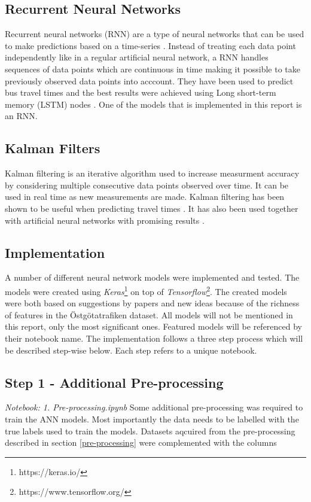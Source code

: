 \subsection{Recurrent Neural Networks}
Recurrent neural networks (RNN) are a type of neural networks that can be used to make predictions based on a time-series \cite{RNN}. Instead of treating each data point independently like in a regular artificial neural network, a RNN handles sequences of data points which are continuous in time making it possible to take previously observed data points into acccount. They have been used to predict bus travel times and the best results were achieved using Long short-term memory (LSTM) nodes \cite{RNNBusPredictions}. One of the models that is implemented in this report is an RNN. 

\subsection{Kalman Filters}
Kalman filtering is an iterative algorithm used to increase measurment accuracy by considering multiple consecutive data points observed over time. It can be used in real time as new measurements are made. Kalman filtering has been shown to be useful when predicting travel times \cite{kalmanPrediction}. It has also been used together with artificial neural networks with promising results \cite{kalmanANN}.

\subsection{Implementation}
A number of different neural network models were implemented and tested. The models were created using \textit{Keras}\footnote{https://keras.io/} on top of \textit{Tensorflow}\footnote{https://www.tensorflow.org/}. The created models were both based on suggestions by papers and new ideas because of the richness of features in the Östgötatrafiken dataset. All models will not be mentioned in this report, only the most significant ones. Featured models will be referenced by their notebook name. The implementation follows a three step process which will be described step-wise below. Each step refers to a unique notebook.

\subsection{Step 1 - Additional Pre-processing}
\textit{Notebook: 1. Pre-processing.ipynb}
\newline
Some additional pre-processing was required to train the ANN models. Most importantly the data needs to be labelled with the true labels used to train the models. Datasets aqcuired from the pre-processing described in section \ref{pre-processing} were complemented with the columns

